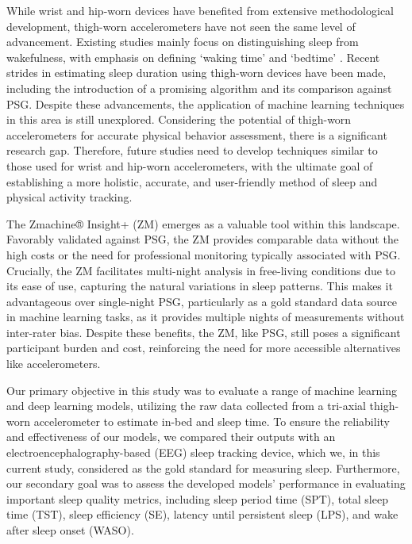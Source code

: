 \documentclass[
  10pt,
  letterpaper,
  DIV=11,
  numbers=noendperiod]{scrartcl}
\begin{document}
While wrist and hip-worn devices have benefited from extensive
methodological development, thigh-worn accelerometers have not seen the
same level of advancement. Existing studies mainly focus on
distinguishing sleep from wakefulness, with emphasis on defining `waking
time' and `bedtime'
\autocite{carlson_validity_2021,inan-eroglu_comparison_2021,van_der_berg_identifying_2016,winkler_identifying_2016}.
Recent strides in estimating sleep duration using thigh-worn devices
have been made, including the introduction of a promising algorithm and
its comparison against PSG\autocite{johansson_development_2023}. Despite
these advancements, the application of machine learning techniques in
this area is still unexplored. Considering the potential of thigh-worn
accelerometers for accurate physical behavior
assessment\autocite{skotte_detection_2014,arvidsson_re-examination_2019},
there is a significant research gap. Therefore, future studies need to
develop techniques similar to those used for wrist and hip-worn
accelerometers, with the ultimate goal of establishing a more holistic,
accurate, and user-friendly method of sleep and physical activity
tracking.

The Zmachine®️ Insight+ (ZM) emerges as a valuable tool within this
landscape. Favorably validated against
PSG\autocite{kaplan_performance_2014,wang_evaluation_2015}, the ZM
provides comparable data without the high costs or the need for
professional monitoring typically associated with PSG. Crucially, the ZM
facilitates multi-night analysis in free-living conditions due to its
ease of use\autocite{pedersen_self-administered_2021}, capturing the
natural variations in sleep patterns. This makes it advantageous over
single-night PSG, particularly as a gold standard data source in machine
learning tasks, as it provides multiple nights of measurements without
inter-rater bias. Despite these benefits, the ZM, like PSG, still poses
a significant participant burden and cost, reinforcing the need for more
accessible alternatives like accelerometers.

Our primary objective in this study was to evaluate a range of machine
learning and deep learning models, utilizing the raw data collected from
a tri-axial thigh-worn accelerometer to estimate in-bed and sleep time.
To ensure the reliability and effectiveness of our models, we compared
their outputs with an electroencephalography-based (EEG) sleep tracking
device, which we, in this current study, considered as the gold standard
for measuring sleep. Furthermore, our secondary goal was to assess the
developed models' performance in evaluating important sleep quality
metrics, including sleep period time (SPT), total sleep time (TST),
sleep efficiency (SE), latency until persistent sleep (LPS), and wake
after sleep onset (WASO).

\newpage


\printbibliography[title=References]
\end{document}
